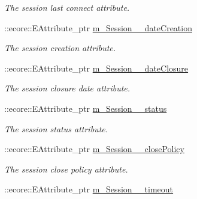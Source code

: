 \begin{DoxyCompactItemize}
\begin{DoxyCompactList}\small\item\em The session last connect attribute. \item\end{DoxyCompactList}\item 
\hypertarget{classUMS__Data_1_1UMS__DataPackage_afb364a3635f12fd561726fe8cb60c4e7}{
::ecore::EAttribute\_\-ptr \hyperlink{classUMS__Data_1_1UMS__DataPackage_afb364a3635f12fd561726fe8cb60c4e7}{m\_\-Session\_\-\_\-dateCreation}}
\label{classUMS__Data_1_1UMS__DataPackage_afb364a3635f12fd561726fe8cb60c4e7}

\begin{DoxyCompactList}\small\item\em The session creation attribute. \item\end{DoxyCompactList}\item 
\hypertarget{classUMS__Data_1_1UMS__DataPackage_a2160e74c0d972b9e2dbc927198b83746}{
::ecore::EAttribute\_\-ptr \hyperlink{classUMS__Data_1_1UMS__DataPackage_a2160e74c0d972b9e2dbc927198b83746}{m\_\-Session\_\-\_\-dateClosure}}
\label{classUMS__Data_1_1UMS__DataPackage_a2160e74c0d972b9e2dbc927198b83746}

\begin{DoxyCompactList}\small\item\em The session closure date attribute. \item\end{DoxyCompactList}\item 
\hypertarget{classUMS__Data_1_1UMS__DataPackage_a57662dfdafb288ecc8a91e62389e9af2}{
::ecore::EAttribute\_\-ptr \hyperlink{classUMS__Data_1_1UMS__DataPackage_a57662dfdafb288ecc8a91e62389e9af2}{m\_\-Session\_\-\_\-status}}
\label{classUMS__Data_1_1UMS__DataPackage_a57662dfdafb288ecc8a91e62389e9af2}

\begin{DoxyCompactList}\small\item\em The session status attribute. \item\end{DoxyCompactList}\item 
\hypertarget{classUMS__Data_1_1UMS__DataPackage_af9580c943512438f92d4e9b2ef67a4ca}{
::ecore::EAttribute\_\-ptr \hyperlink{classUMS__Data_1_1UMS__DataPackage_af9580c943512438f92d4e9b2ef67a4ca}{m\_\-Session\_\-\_\-closePolicy}}
\label{classUMS__Data_1_1UMS__DataPackage_af9580c943512438f92d4e9b2ef67a4ca}

\begin{DoxyCompactList}\small\item\em The session close policy attribute. \item\end{DoxyCompactList}\item 
\hypertarget{classUMS__Data_1_1UMS__DataPackage_a39b002dd70edb36fdc923d03703c30e7}{
::ecore::EAttribute\_\-ptr \hyperlink{classUMS__Data_1_1UMS__DataPackage_a39b002dd70edb36fdc923d03703c30e7}{m\_\-Session\_\-\_\-timeout}}
\label{classUMS__Data_1_1UMS__DataPackage_a39b002dd70edb36fdc923d03703c30e7}


\end{DoxyCompactItemize}
